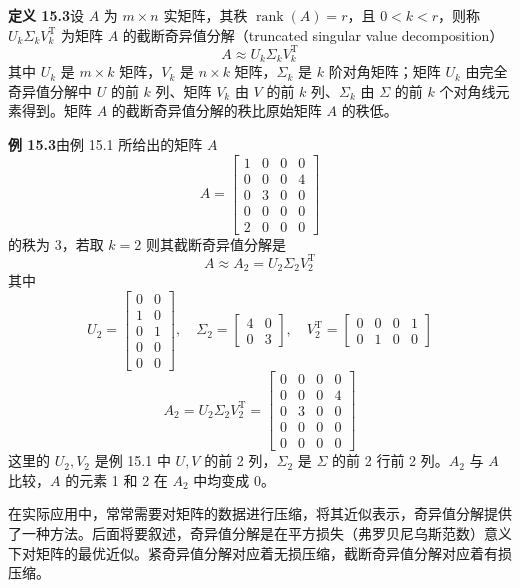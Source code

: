 \documentclass[UTF8,12pt,a4paper,fontset=fandol]{ctexart}
\begin{document}
\noindent\textbf{定义 15.3}\quad 设 $A$ 为 $m\times n$ 实矩阵，其秩 $\operatorname{rank}(A)=r$，且 $0<k<r$，则称 $U_k\Sigma_kV_k^{\mathrm{T}}$ 为矩阵 $A$ 的截断奇异值分解（truncated singular value decomposition）
\begin{equation}
A\approx U_k\Sigma_kV_k^{\mathrm{T}}
\tag{15.19}
\end{equation}
其中 $U_k$ 是 $m\times k$ 矩阵，$V_k$ 是 $n\times k$ 矩阵，$\Sigma_k$ 是 $k$ 阶对角矩阵；矩阵 $U_k$ 由完全奇异值分解中 $U$ 的前 $k$ 列、矩阵 $V_k$ 由 $V$ 的前 $k$ 列、$\Sigma_k$ 由 $\Sigma$ 的前 $k$ 个对角线元素得到。矩阵 $A$ 的截断奇异值分解的秩比原始矩阵 $A$ 的秩低。

\noindent\textbf{例 15.3}\quad 由例 15.1 所给出的矩阵 $A$
\[
A=
\begin{bmatrix}
1&0&0&0\\
0&0&0&4\\
0&3&0&0\\
0&0&0&0\\
2&0&0&0
\end{bmatrix}
\]
的秩为 3，若取 $k=2$ 则其截断奇异值分解是
\[
A\approx A_2=U_2\Sigma_2V_2^{\mathrm{T}}
\]
其中
\[
U_2=
\begin{bmatrix}
0&0\\
1&0\\
0&1\\
0&0\\
0&0
\end{bmatrix},
\quad
\Sigma_2=
\begin{bmatrix}
4&0\\
0&3
\end{bmatrix},
\quad
V_2^{\mathrm{T}}=
\begin{bmatrix}
0&0&0&1\\
0&1&0&0
\end{bmatrix}
\]
\[
A_2=U_2\Sigma_2V_2^{\mathrm{T}}=
\begin{bmatrix}
0&0&0&0\\
0&0&0&4\\
0&3&0&0\\
0&0&0&0\\
0&0&0&0
\end{bmatrix}
\]
这里的 $U_2,V_2$ 是例 15.1 中 $U,V$ 的前 2 列，$\Sigma_2$ 是 $\Sigma$ 的前 2 行前 2 列。$A_2$ 与 $A$ 比较，$A$ 的元素 1 和 2 在 $A_2$ 中均变成 0。

在实际应用中，常常需要对矩阵的数据进行压缩，将其近似表示，奇异值分解提供了一种方法。后面将要叙述，奇异值分解是在平方损失（弗罗贝尼乌斯范数）意义下对矩阵的最优近似。紧奇异值分解对应着无损压缩，截断奇异值分解对应着有损压缩。
\end{document}
